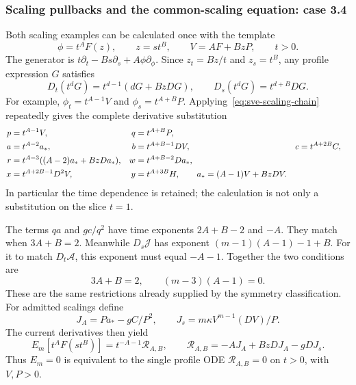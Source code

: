 \subsubsection{Scaling pullbacks and the common-scaling equation: case 3.4}
Both scaling examples can be calculated once with the template
\begin{equation}
 \phi=t^A F(z),\qquad z=st^B,\qquad
 V=AF+BzP,\qquad t>0.
 \label{eq:sve-repro-scale}
\end{equation}
The generator is $t\partial_t-Bs\partial_s+A\phi\partial_\phi$.
Since $z_t=Bz/t$ and $z_s=t^B$, any profile expression $G$ satisfies
\begin{equation}
 D_t(t^dG)=t^{d-1}(dG+BzDG),\qquad
 D_s(t^dG)=t^{d+B}DG.
 \label{eq:sve-scaling-chain}
\end{equation}
For example, $\phi_t=t^{A-1}V$ and $\phi_s=t^{A+B}P$.
Applying~\eqref{eq:sve-scaling-chain} repeatedly gives the complete
derivative substitution
\begin{align}
 p&=t^{A-1}V,&q&=t^{A+B}P,\notag\\
 a&=t^{A-2}a_*,&b&=t^{A+B-1}DV,&c&=t^{A+2B}C,\notag\\
 r&=t^{A-3}((A-2)a_*+BzDa_*),&
 w&=t^{A+B-2}Da_*,\notag\\
 x&=t^{A+2B-1}D^2V,&y&=t^{A+3B}H,
 \qquad a_*=(A-1)V+BzDV.
 \label{eq:sve-scaling-jets}
\end{align}
In particular the time dependence is retained; the calculation is not
only a substitution on the slice $t=1$.

The terms $qa$ and $gc/q^2$ have time exponents $2A+B-2$ and $-A$.
They match when $3A+B=2$. Meanwhile $D_s\mathcal J$ has exponent
$(m-1)(A-1)-1+B$. For it to match $D_t\mathcal A$, this exponent
must equal $-A-1$. Together the two conditions are
\[
 3A+B=2,\qquad (m-3)(A-1)=0.
\]
These are the same restrictions already supplied by the symmetry
classification. For admitted scalings define
\[
 J_A=Pa_*-gC/P^2,\qquad J_s=m\kappa V^{m-1}(DV)/P.
\]
The current derivatives then yield
\begin{equation}
 E_m[t^AF(st^B)]=t^{-A-1}\mathcal R_{A,B},\qquad
 \mathcal R_{A,B}=-A J_A+BzD J_A-gD J_s.
 \label{eq:sve-repro-scale-residual}
\end{equation}
Thus $E_m=0$ is equivalent to the single profile ODE
$\mathcal R_{A,B}=0$ on $t>0$, with $V,P>0$.


